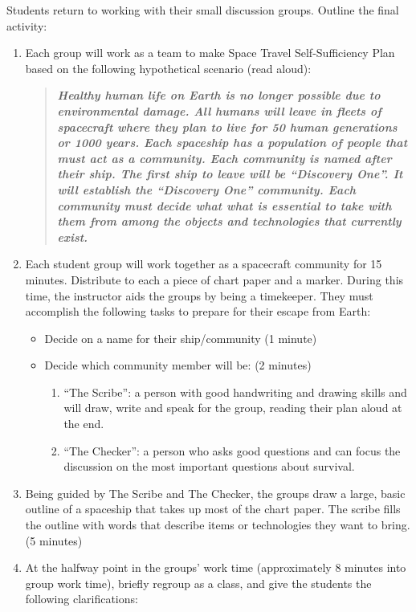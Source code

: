 \documentclass[12pt,]{article}
\providecommand{\tightlist}{%
  \setlength{\itemsep}{0pt}\setlength{\parskip}{0pt}}
\begin{document}
Students return to working with their small discussion groups. Outline
the final activity:

\begin{enumerate}
\def\labelenumi{\arabic{enumi}.}
\item
  Each group will work as a team to make Space Travel Self-Sufficiency
  Plan based on the following hypothetical scenario (read aloud):

  \begin{quote}
  \textbf{\emph{Healthy human life on Earth is no longer possible due to
  environmental damage. All humans will leave in fleets of spacecraft
  where they plan to live for 50 human generations or 1000 years. Each
  spaceship has a population of people that must act as a community. Each
  community is named after their ship. The first ship to leave will be
  ``Discovery One''. It will establish the ``Discovery One'' community. Each
  community must decide what what is essential to take with them from
  among the objects and technologies that currently exist.}}
  \end{quote}
\item
  Each student group will work together as a spacecraft community for
  15 minutes. Distribute to each a piece of chart paper and a marker.
  During this time, the instructor aids the groups by being a
  timekeeper. They must accomplish the following tasks to prepare for
  their escape from Earth:

  \begin{itemize}
  \tightlist
  \item
    Decide on a name for their ship/community (1 minute)
  \item
    Decide which community member will be: (2 minutes)

    \begin{enumerate}
    \def\labelenumii{\roman{enumii}.}
    \tightlist
    \item
      ``The Scribe'': a person with good handwriting and drawing
      skills and will draw, write and speak for the group, reading
      their plan aloud at the end.
    \item
      ``The Checker'': a person who asks good questions and can
      focus the discussion on the most important questions about
      survival.
    \end{enumerate}
  \end{itemize}
\item
  Being guided by The Scribe and The Checker, the groups draw a large,
  basic outline of a spaceship that takes up most of the chart paper.
  The scribe fills the outline with words that describe items or
  technologies they want to bring. (5 minutes)
\item
  At the halfway point in the groups' work time (approximately 8
  minutes into group work time), briefly regroup as a class, and give
  the students the following clarifications:


\end{enumerate}
\end{document}
